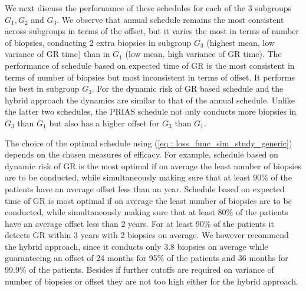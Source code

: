 We next discuss the performance of these schedules for each of the 3 subgroups $G_1, G_2$ and $G_3$. We observe that annual schedule remains the most consistent across subgroups in terms of the offset, but it varies the most in terms of number of biopsies, conducting 2 extra biopsies in subgroup $G_3$ (highest mean, low variance of GR time) than in $G_1$ (low mean, high variance of GR time). The performance of schedule based on expected time of GR is the most consistent in terms of number of biopsies but most inconsistent in terms of offset. It performs the best in subgroup $G_3$. For the dynamic risk of GR based schedule and the hybrid approach the dynamics are similar to that of the annual schedule. Unlike the latter two schedules, the PRIAS schedule not only conducts more biopsies in $G_3$ than $G_1$ but also has a higher offset for $G_3$ than $G_1$.

The choice of the optimal schedule using (\ref{eq : loss_func_sim_study_generic}) depends on the chosen measures of efficacy. For example, schedule based on dynamic risk of GR is the most optimal if on average the least number of biopsies are to be conducted, while simultaneously making sure that at least 90\% of the patients have an average offset less than an year. Schedule based on expected time of GR is most optimal if on average the least number of biopsies are to be conducted, while simultaneously making sure that at least 80\% of the patients have an average offset less than 2 years. For at least 90\% of the patients it detects GR within 3 years with 2 biopsies on average. We however recommend the hybrid approach, since it conducts only 3.8 biopsies on average while guaranteeing an offset of 24 months for 95\% of the patients and 36 months for 99.9\% of the patients. Besides if further cutoffs are required on variance of number of biopsies or offset they are not too high either for the hybrid approach.